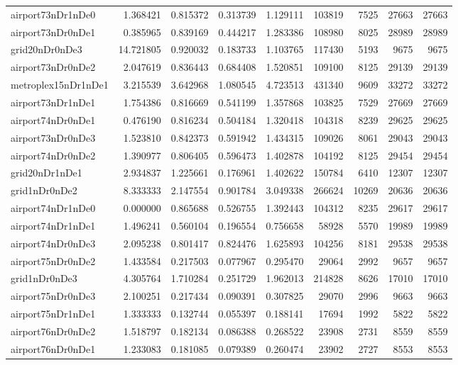 \documentclass[../../../thesis.tex]{subfiles}
\begin{document}
\begin{longtable}{|l|r|r|r|r|r|r|r|r|}
airport73nDr1nDe0 & 1.368421 & 0.815372 & 0.313739 & 1.129111 & 103819 & 7525 & 27663 & 27663 \\
airport73nDr0nDe1 & 0.385965 & 0.839169 & 0.444217 & 1.283386 & 108980 & 8025 & 28989 & 28989 \\
grid20nDr0nDe3 & 14.721805 & 0.920032 & 0.183733 & 1.103765 & 117430 & 5193 & 9675 & 9675 \\
airport73nDr0nDe2 & 2.047619 & 0.836443 & 0.684408 & 1.520851 & 109100 & 8125 & 29139 & 29139 \\
metroplex15nDr1nDe1 & 3.215539 & 3.642968 & 1.080545 & 4.723513 & 431340 & 9609 & 33272 & 33272 \\
airport73nDr1nDe1 & 1.754386 & 0.816669 & 0.541199 & 1.357868 & 103825 & 7529 & 27669 & 27669 \\
airport74nDr0nDe1 & 0.476190 & 0.816234 & 0.504184 & 1.320418 & 104318 & 8239 & 29625 & 29625 \\
airport73nDr0nDe3 & 1.523810 & 0.842373 & 0.591942 & 1.434315 & 109026 & 8061 & 29043 & 29043 \\
airport74nDr0nDe2 & 1.390977 & 0.806405 & 0.596473 & 1.402878 & 104192 & 8125 & 29454 & 29454 \\
grid20nDr1nDe1 & 2.934837 & 1.225661 & 0.176961 & 1.402622 & 150784 & 6410 & 12307 & 12307 \\
grid1nDr0nDe2 & 8.333333 & 2.147554 & 0.901784 & 3.049338 & 266624 & 10269 & 20636 & 20636 \\
airport74nDr1nDe0 & 0.000000 & 0.865688 & 0.526755 & 1.392443 & 104312 & 8235 & 29617 & 29617 \\
airport74nDr1nDe1 & 1.496241 & 0.560104 & 0.196554 & 0.756658 & 58928 & 5570 & 19989 & 19989 \\
airport74nDr0nDe3 & 2.095238 & 0.801417 & 0.824476 & 1.625893 & 104256 & 8181 & 29538 & 29538 \\
airport75nDr0nDe2 & 1.433584 & 0.217503 & 0.077967 & 0.295470 & 29064 & 2992 & 9657 & 9657 \\
grid1nDr0nDe3 & 4.305764 & 1.710284 & 0.251729 & 1.962013 & 214828 & 8626 & 17010 & 17010 \\
airport75nDr0nDe3 & 2.100251 & 0.217434 & 0.090391 & 0.307825 & 29070 & 2996 & 9663 & 9663 \\
airport75nDr1nDe1 & 1.333333 & 0.132744 & 0.055397 & 0.188141 & 17694 & 1992 & 5822 & 5822 \\
airport76nDr0nDe2 & 1.518797 & 0.182134 & 0.086388 & 0.268522 & 23908 & 2731 & 8559 & 8559 \\
airport76nDr0nDe1 & 1.233083 & 0.181085 & 0.079389 & 0.260474 & 23902 & 2727 & 8553 & 8553 \\

\end{longtable}
\end{document}
